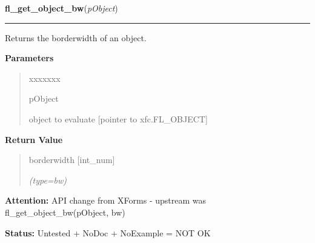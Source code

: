 \hspace{.8\funcindent}\begin{boxedminipage}{\funcwidth}

    \raggedright \textbf{fl\_get\_object\_bw}(\textit{pObject})

    \vspace{-1.5ex}

    \rule{\textwidth}{0.5\fboxrule}
\setlength{\parskip}{2ex}
    Returns the borderwidth of an object.

\setlength{\parskip}{1ex}
      \textbf{Parameters}
      \vspace{-1ex}

      \begin{quote}
        \begin{Ventry}{xxxxxxx}

          \item[pObject]

          object to evaluate [pointer to xfc.FL\_OBJECT]

        \end{Ventry}

      \end{quote}

      \textbf{Return Value}
    \vspace{-1ex}

      \begin{quote}
      borderwidth [int\_num]

      {\it (type=bw)}

      \end{quote}

\textbf{Attention:} API change from XForms - upstream was fl\_get\_object\_bw(pObject, bw)



\textbf{Status:} Untested + NoDoc + NoExample = NOT OK



    \end{boxedminipage}

    \label{xformslib:library:fl_set_object_resize}

    \vspace{0.5ex}

